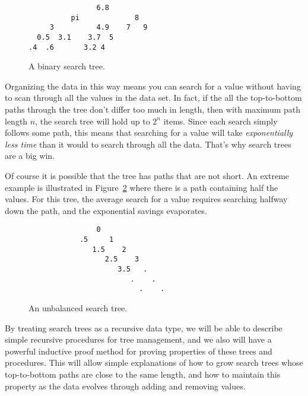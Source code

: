 \begin{figure}

\begin{center}
\begin{verbatim}
                6.8
          pi             8  
     3          4.9    7   9 
  0.5  3.1    3.7  5
.4  .6       3.2 4 
\end{verbatim}
\end{center}

\caption{A binary search tree.}

\label{searchtree1}

\end{figure}

Organizing the data in this way means you can search for a value
without having to scan through all the values in the data set.  In
fact, if the all the top-to-bottom paths through the tree don't differ
too much in length, then with maximum path length $n$, the search tree
will hold up to $2^n$ items.  Since each search simply follows some
path, this means that searching for a value will take
\emph{exponentially less time} than it would to search through all the
data.  That's why search trees are a big win.

Of course it is possible that the tree has paths that are not short.
An extreme example is illustrated in Figure~\ref{unbalanced} where
there is a path containing half the values.  For this tree, the
average search for a value requires searching halfway down the path,
and the exponential savings evaporates.

\begin{figure}

\begin{center}
\begin{verbatim}
                0
            .5     1
               1.5    2
                  2.5    3
                     3.5   .
                        .    .
                          .    .
\end{verbatim}   
\end{center}

\caption{An unbalanced search tree.}

\label{unbalanced}

\end{figure}

By treating search trees as a recursive data type, we will be able to
describe simple recursive procedures for tree management, and we also
will have a powerful inductive proof method for proving properties of
these trees and procedures.  This will allow simple explanations of
how to grow search trees whose top-to-bottom paths are close to the
same length, and how to maintain this property as the data evolves
through adding and removing values.

